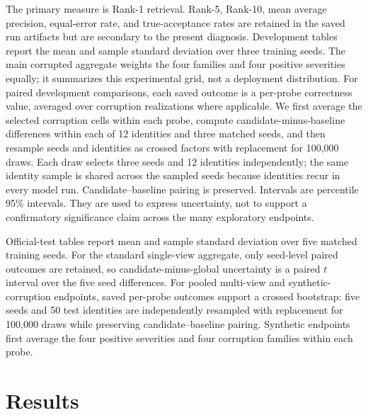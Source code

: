 \documentclass[pdflatex,iicol,sn-apa]{sn-jnl}
\begin{document}
The primary measure is Rank-1 retrieval. Rank-5, Rank-10, mean average
precision, equal-error rate, and true-acceptance rates are retained in the
saved run artifacts but are secondary to the present diagnosis. Development
tables report the mean and sample standard deviation over three training seeds. The main
corrupted aggregate weights the four families and four positive severities
equally; it summarizes this experimental grid, not a deployment distribution.
For paired development comparisons, each saved outcome is a per-probe correctness value,
averaged over corruption realizations where applicable. We first average the
selected corruption cells within each probe, compute candidate-minus-baseline
differences within each of 12 identities and three matched seeds, and then
resample seeds and identities as crossed factors with replacement for
100,000 draws. Each draw selects three seeds and 12 identities independently;
the same identity sample is shared across the sampled seeds because identities
recur in every model run. Candidate--baseline pairing is preserved.
Intervals are percentile 95\% intervals. They are used to express uncertainty,
not to support a confirmatory significance claim across the many exploratory
endpoints.

Official-test tables report mean and sample standard deviation over five
matched training seeds. For the standard single-view aggregate, only seed-level
paired outcomes are retained, so candidate-minus-global uncertainty is a paired
$t$ interval over the five seed differences. For pooled multi-view and
synthetic-corruption endpoints, saved per-probe outcomes support a crossed
bootstrap: five seeds and 50 test identities are independently resampled with
replacement for 100,000 draws while preserving candidate--baseline pairing.
Synthetic endpoints first average the four positive severities and four
corruption families within each probe.

\section{Results}
\end{document}
